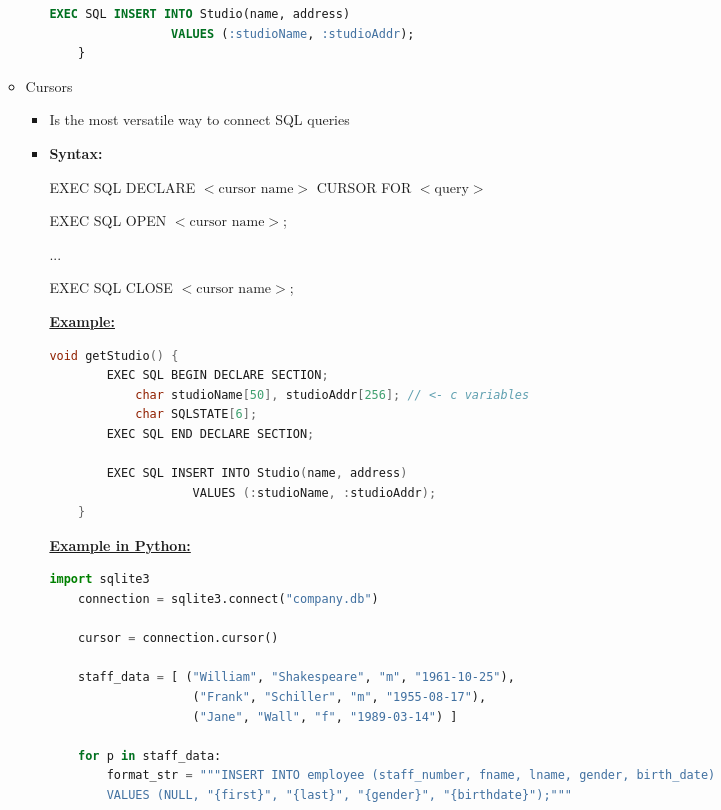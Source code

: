 \documentclass[12pt]{article}
\begin{document}
\begin{enumerate}[1.]
\begin{itemize}
\begin{itemize}
\begin{lstlisting}[language=SQL]
        EXEC SQL INSERT INTO Studio(name, address)
                 VALUES (:studioName, :studioAddr);
    }
    \end{lstlisting}
        \end{itemize}

        \item Cursors
        \begin{itemize}
            \item Is the most versatile way to connect SQL queries
            \item \textbf{Syntax:}

            EXEC SQL DECLARE $<\text{cursor name}>$ CURSOR FOR $<\text{query}>$

            \bigskip

            EXEC SQL OPEN $<\text{cursor name}>$;

            ...

            EXEC SQL CLOSE $<\text{cursor name}>$;

            \bigskip

            \underline{\textbf{Example:}}

            \bigskip

    \begin{lstlisting}[language=c]
    void getStudio() {
        EXEC SQL BEGIN DECLARE SECTION;
            char studioName[50], studioAddr[256]; // <- c variables
            char SQLSTATE[6];
        EXEC SQL END DECLARE SECTION;

        EXEC SQL INSERT INTO Studio(name, address)
                    VALUES (:studioName, :studioAddr);
    }
    \end{lstlisting}

            \bigskip

            \underline{\textbf{Example in Python:}}

            \bigskip

    \begin{lstlisting}[language=python]
    import sqlite3
    connection = sqlite3.connect("company.db")

    cursor = connection.cursor()

    staff_data = [ ("William", "Shakespeare", "m", "1961-10-25"),
                    ("Frank", "Schiller", "m", "1955-08-17"),
                    ("Jane", "Wall", "f", "1989-03-14") ]

    for p in staff_data:
        format_str = """INSERT INTO employee (staff_number, fname, lname, gender, birth_date)
        VALUES (NULL, "{first}", "{last}", "{gender}", "{birthdate}");"""


\end{lstlisting}
\end{itemize}
\end{itemize}
\end{enumerate}
\end{document}

